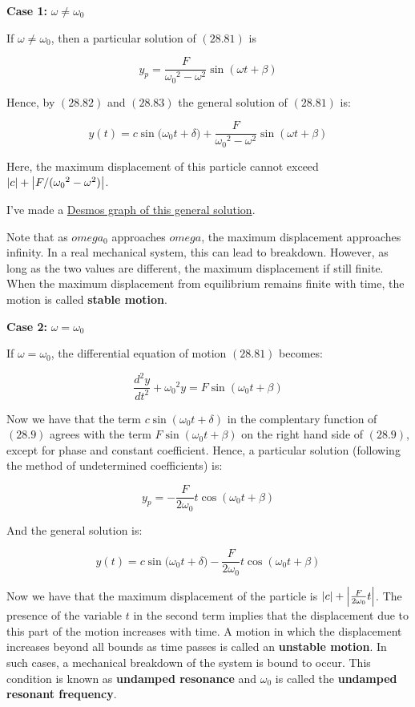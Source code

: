 \documentclass{article}
\begin{document}
\textbf{Case 1:} $\omega \neq \omega_0$

If $\omega \neq \omega_0$, then a particular solution of $(28.81)$ is

\[ \tag{28.83} y_p = \frac{F}{ {\omega_0}^2 - \omega^2} \sin{(\omega t + \beta)} \]

Hence, by $(28.82)$ and $(28.83)$ the general solution of $(28.81)$ is:

\[ \tag{28.84}  y(t) = c \sin{(\omega_0 t + \delta}) + \frac{F}{ {\omega_0}^2 - \omega^2} \sin{(\omega t + \beta)} \]

Here, the maximum displacement of this particle cannot exceed $\left| c \right| + \left| F/({\omega_0}^2 - \omega^2) \right|$.

I've made a \href{https://www.desmos.com/calculator/caqdrbowgi}{Desmos graph of this general solution}.

Note that as $omega_0$ approaches $omega$, the maximum displacement approaches infinity. In a real mechanical system, this can lead to breakdown. However, as long as the two values are different, the maximum displacement if still finite. When the maximum displacement from equilibrium remains finite with time, the motion is called \textbf{stable motion}.

\textbf{Case 2:} $\omega = \omega_0$

If $\omega = \omega_0$, the differential equation of motion $(28.81)$ becomes:

\[ \tag{28.9} \frac{d^2y}{dt^2} + {\omega_0}^2 y = F \sin{(\omega_0 t + \beta)} \]

Now we have that the term $c \sin{(\omega_0 t + \delta)}$ in the complentary function of $(28.9)$ agrees with the term $F \sin{(\omega_0 t + \beta)}$ on the right hand side of $(28.9)$, except for phase and constant coefficient. Hence, a particular solution (following the method of undetermined coefficients) is:

\[ \tag{28.92} y_p = - \frac{F}{2 \omega_0} t \cos{(\omega_0 t + \beta)} \]

And the general solution is:

\[ \tag{28.93} y(t) = c \sin{(\omega_0 t + \delta}) - \frac{F}{2 \omega_0} t \cos{(\omega_0 t + \beta)} \]

Now we have that the maximum displacement of the particle is $\left| c \right| + \left| \frac{F}{2 \omega_0} t \right| $. The presence of the variable $t$ in the second term implies that the displacement due to this part of the motion increases with time. A motion in which the displacement increases beyond all bounds as time passes is called an \textbf{unstable motion}. In such cases, a mechanical breakdown of the system is bound to occur. This condition is known as \textbf{undamped resonance} and $\omega_0$ is called the \textbf{undamped resonant frequency}.
\end{document}
